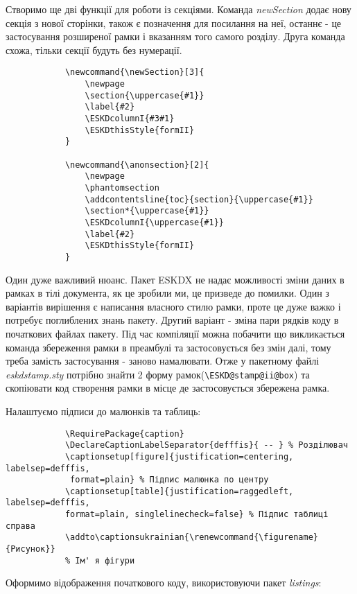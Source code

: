 Створимо ще дві функції для роботи із секціями. Команда \textit{newSection} додає нову секція з нової сторінки, також є позначення для посилання на неї, останнє - це застосування розширеної рамки і вказанням того самого розділу. Друга команда схожа, тільки секції будуть без нумерації.
\begin{lstlisting}
			\newcommand{\newSection}[3]{
				\newpage
				\section{\uppercase{#1}}
				\label{#2}
				\ESKDcolumnI{#3#1}
				\ESKDthisStyle{formII}
			}
			
			\newcommand{\anonsection}[2]{
				\newpage
				\phantomsection
				\addcontentsline{toc}{section}{\uppercase{#1}}
				\section*{\uppercase{#1}}
				\ESKDcolumnI{\uppercase{#1}}
				\label{#2}
				\ESKDthisStyle{formII}
			}
\end{lstlisting}

Один дуже важливий нюанс. Пакет ESKDX не надає можливості зміни даних в рамках в тілі документа, як це зробили ми, це призведе до помилки. Один з варіантів вирішення є написання власного стилю рамки, проте це дуже важко і потребує поглиблених знань пакету. Другий варіант - зміна пари рядків коду в початкових файлах пакету. Під час компіляції можна побачити що викликається команда збереження рамки в преамбулі та застосовується без змін далі, тому треба замість застосування - заново намалювати. Отже у пакетному файлі \textit{eskdstamp.sty} потрібно знайти 2 форму рамок(\verb|\ESKD@stamp@ii@box|) та скопіювати код створення рамки в місце де застосовується збережена рамка. 

Налаштуємо підписи до малюнків та таблиць:

\begin{lstlisting}
			\RequirePackage{caption}
			\DeclareCaptionLabelSeparator{defffis}{ -- } % Розділювач
			\captionsetup[figure]{justification=centering, labelsep=defffis,
			 format=plain} % Підпис малюнка по центру
			\captionsetup[table]{justification=raggedleft, labelsep=defffis, 
			format=plain, singlelinecheck=false} % Підпис таблиці справа
			\addto\captionsukrainian{\renewcommand{\figurename}{Рисунок}} 
			% Ім' я фігури
\end{lstlisting}

Оформимо відображення початкового коду, використовуючи пакет \textit{listings}:

